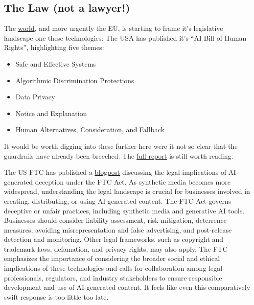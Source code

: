 \subsection{The Law (not a lawyer!)}
The \href{https://www.holisticai.com/papers/the-state-of-ai-regulations-in-2023}{world}, and more urgently the EU, is starting to frame it's legislative landscape one these technologies:
The USA has published it's ``AI Bill of Human Rights'', highlighting five themes:
\begin{itemize}
\item Safe and Effective Systems
\item Algorithmic Discrimination Protections
\item Data Privacy
\item Notice and Explanation
\item Human Alternatives, Consideration, and Fallback
\end{itemize}
It would be worth digging into these further here were it not so clear that the guardrails have already been breeched. The \href{https://www.whitehouse.gov/wp-content/uploads/2022/10/Blueprint-for-an-AI-Bill-of-Rights.pdf}{full report} is still worth reading.\par 
The US FTC has published a \href{}{blogpost} discussing the legal implications of AI-generated deception under the FTC Act. As synthetic media becomes more widespread, understanding the legal landscape is crucial for businesses involved in creating, distributing, or using AI-generated content. The FTC Act governs deceptive or unfair practices, including synthetic media and generative AI tools. Businesses should consider liability assessment, risk mitigation, deterrence measures, avoiding misrepresentation and false advertising, and post-release detection and monitoring. Other legal frameworks, such as copyright and trademark laws, defamation, and privacy rights, may also apply. The FTC emphasizes the importance of considering the broader social and ethical implications of these technologies and calls for collaboration among legal professionals, regulators, and industry stakeholders to ensure responsible development and use of AI-generated content. It feels like even this comparatively swift response is too little too late. 

